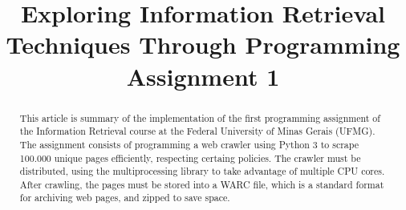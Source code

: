 
\title[Exploring IR Techniques Through PA 1]{Exploring Information Retrieval Techniques Through Programming Assignment 1} %

\begin{abstract}
  This article is summary of the implementation of the first programming assignment of the Information Retrieval course at the Federal University of Minas Gerais (UFMG). The assignment consists of programming a web crawler using Python 3 to scrape 100.000 unique pages efficiently, respecting certaing policies. The crawler must be distributed, using the multiprocessing library to take advantage of multiple CPU cores. After crawling, the pages must be stored into a WARC file, which is a standard format for archiving web pages, and zipped to save space.
\end{abstract}




\maketitle

